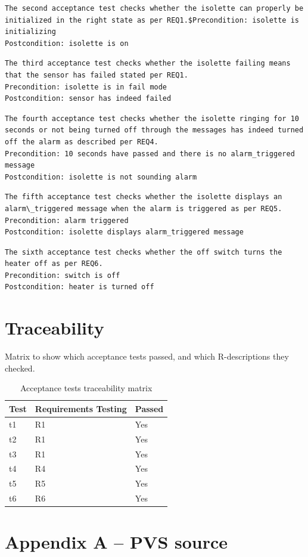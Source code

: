 \documentclass[fontsize=12pt,paper=letter,twoside]{scrartcl}
\begin{document}
\begin{lstlisting}
The second acceptance test checks whether the isolette can properly be initialized in the right state as per REQ1.$Precondition: isolette is initializing
Postcondition: isolette is on
\end{lstlisting}

\begin{lstlisting}
The third acceptance test checks whether the isolette failing means that the sensor has failed stated per REQ1.
Precondition: isolette is in fail mode
Postcondition: sensor has indeed failed
\end{lstlisting}

\begin{lstlisting}
The fourth acceptance test checks whether the isolette ringing for 10 seconds or not being turned off through the messages has indeed turned off the alarm as described per REQ4.
Precondition: 10 seconds have passed and there is no alarm_triggered message
Postcondition: isolette is not sounding alarm
\end{lstlisting}

\begin{lstlisting}
The fifth acceptance test checks whether the isolette displays an alarm\_triggered message when the alarm is triggered as per REQ5.
Precondition: alarm triggered
Postcondition: isolette displays alarm_triggered message
\end{lstlisting}

\begin{lstlisting}
The sixth acceptance test checks whether the off switch turns the heater off as per REQ6.
Precondition: switch is off
Postcondition: heater is turned off
\end{lstlisting}

\section{Traceability}
\FloatBarrier
Matrix to show which acceptance tests passed, and which R-descriptions they checked.

\begin{table}[htb]
\centering
\label{my-label}
\begin{tabular}{|l|l|l|}
\hline
Test & Requirements Testing & Passed \\ \hline
t1   & R1                   & Yes    \\ \hline
t2   & R1                   & Yes    \\ \hline
t3   & R1                   & Yes    \\ \hline
t4   & R4                   & Yes    \\ \hline
t5   & R5                   & Yes    \\ \hline
t6   & R6                   & Yes    \\ \hline
\end{tabular}
\caption{Acceptance tests traceability matrix}
\end{table}
\FloatBarrier

\section{Appendix A -- PVS source}



\end{document}
